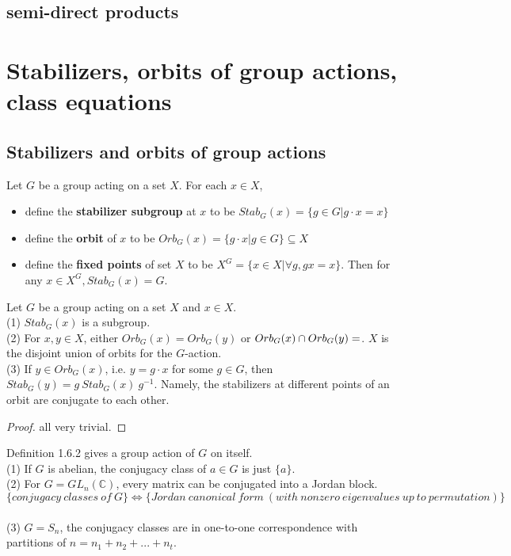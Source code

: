 \documentclass[11pt,fleqn]{book} %
\begin{document}
\begin{CJK}{UTF8}{gkai}
\subsection{semi-direct products}

\section{Stabilizers, orbits of group actions, class equations}
\subsection{Stabilizers and orbits of group actions}
\begin{definition}
	Let $G$ be a group acting on a set $X$. For each $x \in X$,
	\begin{itemize}
		\item define the {\bf stabilizer subgroup} at $x$ to be $Stab_G(x)=\{g\in G| g\cdot x = x\}$
		\item define the {\bf orbit} of $x$ to be $Orb_G(x) = \{g\cdot x | g \in G\}\subseteq X$ 	
		\item define the {\bf fixed points} of set $X$ to be $X^G = \{x \in X | \forall g, gx = x\}$. Then for any $x \in X^G, Stab_G(x) = G$.
	\end{itemize}
\end{definition}

\begin{proposition}
	Let $G$ be a group acting on a set $X$ and $x\in X$. \\
	(1) $Stab_G(x)$ is a subgroup. \\
	(2) For $x,y \in X$, either $Orb_G(x) = Orb_G(y)$ or $Orb_G(x) \cap Orb_G(y) = \empty$. $X$ is the disjoint union of orbits for the $G$-action. \\
	(3) If $y \in Orb_G(x)$, i.e. $y = g\cdot x$ for some $g\in G$, then $Stab_G(y) = g \ Stab_G(x) \  g^{-1}$. Namely, the stabilizers at different points of an orbit are conjugate to each other.
\end{proposition}
\begin{proof}
	all very trivial.	
\end{proof}

\begin{example}
	 Definition 1.6.2 gives a group action of $G$ on itself. \\
	(1) If $G$ is abelian, the conjugacy class of $a\in G$ is just $\{a\}$. \\
	(2) For $G = GL_n(\mathbb{C})$, every matrix can be conjugated into a Jordan block. \[
		\{conjugacy \ classes \ of \ G\} \iff \{Jordan \ canonical\ form \ (with \ nonzero \ eigenvalues \ up \ to \ permutation)\} \] \\
	(3) $G = S_n$, the conjugacy classes are in one-to-one correspondence with partitions of $n = n_1 + n_2 + ... + n_t$.
\end{example}


\end{CJK}
\end{document}
